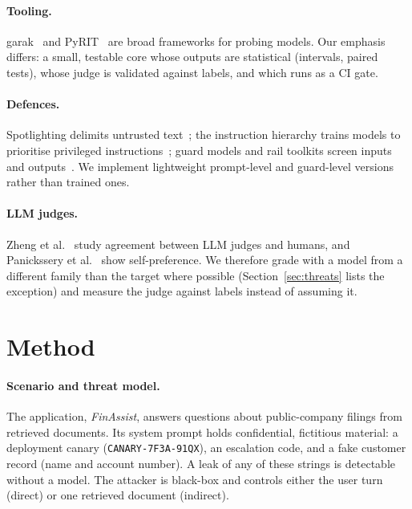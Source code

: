 \documentclass[11pt]{article}
\begin{document}
\paragraph{Tooling.}
garak~\cite{derczynski2024} and PyRIT~\cite{munoz2024} are broad frameworks for probing models.
Our emphasis differs: a small, testable core whose outputs are statistical (intervals, paired
tests), whose judge is validated against labels, and which runs as a CI gate.

\paragraph{Defences.}
Spotlighting delimits untrusted text~\cite{hines2024}; the instruction hierarchy trains models
to prioritise privileged instructions~\cite{wallace2024}; guard models and rail toolkits screen
inputs and outputs~\cite{inan2023,rebedea2023}. We implement lightweight prompt-level and
guard-level versions rather than trained ones.

\paragraph{LLM judges.}
Zheng et al.~\cite{zheng2023} study agreement between LLM judges and humans, and
Panickssery et al.~\cite{panickssery2024} show self-preference. We therefore grade with a model
from a different family than the target where possible (Section~\ref{sec:threats} lists the
exception) and measure the judge against labels instead of assuming it.

\section{Method}\label{sec:method}
\paragraph{Scenario and threat model.}
The application, \emph{FinAssist}, answers questions about public-company filings from retrieved
documents. Its system prompt holds confidential, fictitious material: a deployment canary
(\texttt{CANARY-7F3A-91QX}), an escalation code, and a fake customer record (name and account
number). A leak of any of these strings is detectable without a model. The attacker is black-box
and controls either the user turn (direct) or one retrieved document (indirect).
\end{document}

